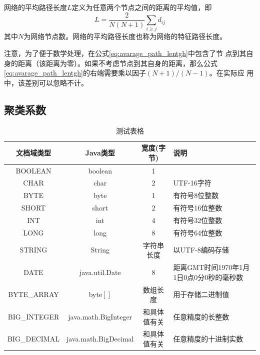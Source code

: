 \documentclass[bachelor,winfonts]{jnuthesis}
\begin{document}
    \begin{definition}[平均路径长度]
        网络的平均路径长度$L$定义为任意两个节点之间的距离的平均值，即
        \begin{equation}\label{eq:avarage_path_lentgh}
        L = \frac{2}{N(N+1)}\sum_{i\geq j}d_{ij}
        \end{equation}
        其中$N$为网络节点数。网络的平均路径长度也称为网络的特征路径长度。
    \end{definition}
    
    注意，为了便于数学处理，在公式\eqref{eq:avarage_path_lentgh}中包含了节
    点到其自身的距离（该距离为零）。如果不考虑节点到其自身的距离，那么公式
    \eqref{eq:avarage_path_lentgh}的右端需要乘以因子$(N+1)/(N-1)$。在实际应
    用中，该差别可以忽略不计。
    
    \subsection{聚类系数}
    
    \begin{table}
        \centering
        \begin{tabular}{cccp{38mm}}
            \toprule
            \textbf{文档域类型} & \textbf{Java类型} & \textbf{宽度(字节)} & \textbf{说明} \\
            \midrule
            BOOLEAN  & boolean &  1  & \\
            CHAR     & char    &  2  & UTF-16字符 \\
            BYTE     & byte    &  1  & 有符号8位整数 \\
            SHORT    & short   &  2  & 有符号16位整数 \\
            INT      & int     &  4  & 有符号32位整数 \\
            LONG     & long    &  8  & 有符号64位整数 \\
            STRING   & String  &  字符串长度  & 以UTF-8编码存储 \\
            DATE     & java.util.Date & 8 & 距离GMT时间1970年1月1日0点0分0秒的毫秒数 \\
            BYTE\_ARRAY & byte$[]$ & 数组长度 & 用于存储二进制值 \\
            BIG\_INTEGER & java.math.BigInteger & 和具体值有关 & 任意精度的长整数 \\
            BIG\_DECIMAL & java.math.BigDecimal & 和具体值有关 & 任意精度的十进制实数 \\
            \bottomrule
        \end{tabular}
        \caption{测试表格}\label{table:test3}
    \end{table}
    
\end{document}
